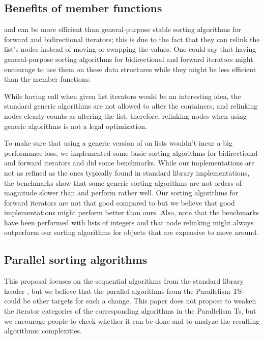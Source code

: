 \documentclass{isocpp_proposal}
\begin{document}
\subsection{Benefits of  member functions}

 and  can be more efficient than general-purpose stable sorting algorithms for forward and bidirectional iterators; this is due to the fact that they can relink the list's nodes instead of moving or swapping the values. One could say that having general-purpose sorting algorithms for bidirectional and forward iterators might encourage to use them on these data structures while they might be less efficient than the member functions.

\vspace{0.3cm}

While having  call  when given list iterators would be an interesting idea, the standard generic algorithms are not allowed to alter the containers, and relinking nodes clearly counts as altering the list; therefore, relinking nodes when using generic algorithms is not a legal optimization.

\vspace{0.3cm}

To make sure that using a generic version of  on lists wouldn't incur a big performance loss, we implemented some basic sorting algorithms for bidirectional and forward iterators and did some benchmarks. While our implementations are not as refined as the ones typically found in standard library implementations, the benchmarks show that some generic sorting algorithms are not orders of magnitude slower than  and perform rather well. Our sorting algorithms for forward iterators are not that good compared to  but we believe that good implementations might perform better than ours. Also, note that the benchmarks have been performed with lists of integers and that node relinking might always outperform our sorting algorithms for objects that are expensive to move around.

\subsection{Parallel sorting algorithms}

This proposal focuses on the sequential algorithms from the standard library header , but we believe that the parallel algorithms from the Parallelism TS \cite{N4507} could be other targets for such a change. This paper does not propose to weaken the iterator categories of the corresponding algorithms in the Parallelism Ts, but we encourage people to check whether it can be done and to analyze the resulting algorithmic complexities.
\end{document}

